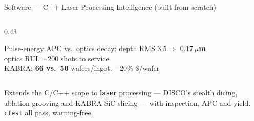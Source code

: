 \documentclass[aspectratio=169,11pt]{beamer}
\begin{document}
\begin{frame}[shrink=10]{Software --- C++ Laser-Processing Intelligence (built from scratch)}
\begin{columns}[T]
\begin{column}{0.43\textwidth}
      \vspace{0.3em}
      \begin{block}{}
        \footnotesize
        Pulse-energy APC vs.\ optics decay: depth RMS $3.5 \Rightarrow$
          \textcolor{discoblue}{\textbf{$0.17~\mu$m}}\\
        optics RUL $\sim$200 shots to service\\
        KABRA: \textbf{66 vs.\ 50} wafers/ingot, $-20\%$ \$/wafer
      \end{block}
    \end{column}
  \end{columns}
  \vspace{0.2em}
  {\footnotesize\textcolor{discogray}{Extends the C/C++ scope to \textbf{laser}
    processing --- DISCO's stealth dicing, ablation grooving and KABRA SiC
    slicing --- with inspection, APC and yield. \texttt{ctest} all pass, warning-free.}}
\end{frame}
\end{document}
